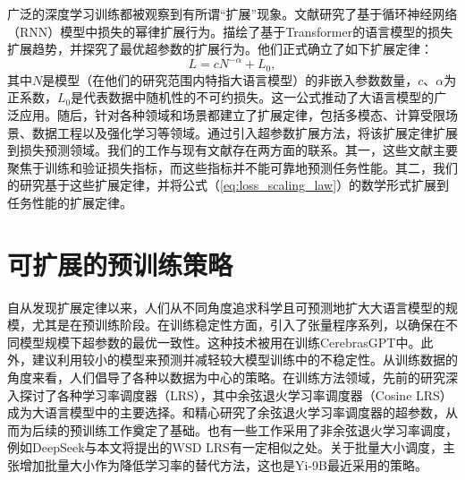 广泛的深度学习训练都被观察到有所谓“扩展”现象\citep{hestness2017deep, kaplan2020scaling, rae2021scaling, aghajanyan2023scaling}。文献\citet{hestness2017deep}研究了基于循环神经网络（RNN）模型中损失的幂律扩展行为。\citet{kaplan2020scaling}描绘了基于Transformer的语言模型的损失扩展趋势，并探究了最优超参数的扩展行为。他们正式确立了如下扩展定律：
\begin{equation}
\label{eq:loss_scaling_law}
    L = c N^{-\alpha} + L_0,
\end{equation}
其中\(N\)是模型（在他们的研究范围内特指大语言模型）的非嵌入参数数量，\(c\)、\(\alpha\)为正系数，\(L_0\)是代表数据中随机性的不可约损失。这一公式推动了大语言模型的广泛应用。随后，针对各种领域和场景都建立了扩展定律，包括多模态\citep{henighan2020scaling, zhai2022scaling}、计算受限场景\citep{hoffmann2022training}、数据工程\citep{muennighoff2023scaling,sorscher2022beyond}以及强化学习\citep{gao2023scaling}等领域。\citet{yao2023research}通过引入超参数扩展方法，将该扩展定律扩展到损失预测领域。我们的工作与现有文献存在两方面的联系。其一，这些文献主要聚焦于训练和验证损失指标，而这些指标并不能可靠地预测任务性能。其二，我们的研究基于这些扩展定律，并将公式（\ref{eq:loss_scaling_law}）的数学形式扩展到任务性能的扩展定律。

\section{可扩展的预训练策略}

自从发现扩展定律\citep{hestness2017deep, kaplan2020scaling, rae2021scaling, aghajanyan2023scaling}以来，人们从不同角度追求科学且可预测地\citep{achiam2023gpt,hu2023unlock, du2024understanding}扩大大语言模型的规模，尤其是在预训练阶段。在训练稳定性方面，引入了张量程序系列\citep{yang2022tensor, yang2023tensor}，以确保在不同模型规模下超参数的最优一致性。这种技术被用在训练CerebrasGPT\citep{dey2023cerebras}中。此外，\cite{wortsman2023small}建议利用较小的模型来预测并减轻较大模型训练中的不稳定性。从训练数据的角度来看，人们倡导了各种以数据为中心的策略\citep{xie2024doremi, shi2023context, ye2024data}。在训练方法领域，先前的研究深入探讨了各种学习率调度器（LRS）\citep{howard2018universal, raffel2020exploring, hundt2019sharpdarts}，其中余弦退火学习率调度器（Cosine LRS）\citep{loshchilov2016sgdr}成为大语言模型中的主要选择。\cite{kaplan2020scaling}和\cite{hoffmann2022training}精心研究了余弦退火学习率调度器的超参数，从而为后续的预训练工作奠定了基础。也有一些工作采用了非余弦退火学习率调度，例如DeepSeek\citep{bi2024deepseek}与本文将提出的WSD LRS有一定相似之处。关于批量大小调度，\cite{smith2017don}主张增加批量大小作为降低学习率的替代方法，这也是Yi-9B\citep{young2024yi}最近采用的策略。

